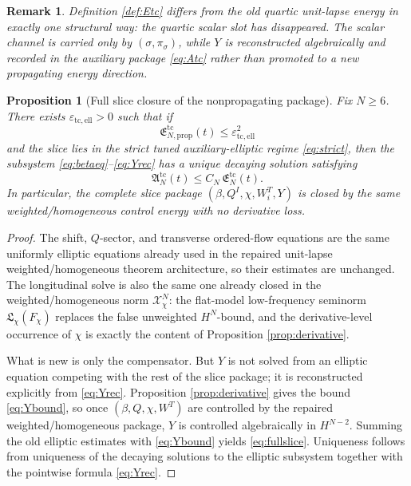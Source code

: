 \documentclass[11pt]{article}
\newtheorem{proposition}{Proposition}
\newtheorem{remark}{Remark}
\begin{document}
\begin{remark}
Definition \ref{def:Etc} differs from the old quartic unit-lapse energy in exactly one structural way: the quartic scalar slot has disappeared. The scalar channel is carried only by \((\sigma,\pi_\sigma)\), while \(Y\) is reconstructed algebraically and recorded in the auxiliary package \eqref{eq:Atc} rather than promoted to a new propagating energy direction.
\end{remark}

\begin{proposition}[Full slice closure of the nonpropagating package]
\label{prop:fullell}
Fix \(N\ge 6\). There exists \(\varepsilon_{\mathrm{tc,ell}}>0\) such that if
\begin{equation}
\mathfrak E_{N,\mathrm{prop}}^{\mathrm{tc}}(t)
\le
\varepsilon_{\mathrm{tc,ell}}^2
\label{eq:ellsmall}
\end{equation}
and the slice lies in the strict tuned auxiliary-elliptic regime \eqref{eq:strict}, then the subsystem \eqref{eq:betaeq}--\eqref{eq:Yrec} has a unique decaying solution satisfying
\begin{equation}
\mathfrak A_N^{\mathrm{tc}}(t)
\le
C_N\,\mathfrak E_N^{\mathrm{tc}}(t).
\label{eq:fullslice}
\end{equation}
In particular, the complete slice package \((\beta,Q^I,\chi,W_i^T,Y)\) is closed by the same weighted/homogeneous control energy with no derivative loss.
\end{proposition}

\begin{proof}
The shift, \(Q\)-sector, and transverse ordered-flow equations are the same uniformly elliptic equations already used in the repaired unit-lapse weighted/homogeneous theorem architecture, so their estimates are unchanged. The longitudinal solve is also the same one already closed in the weighted/homogeneous norm \(\mathcal X_\chi^N\): the flat-model low-frequency seminorm \(\mathfrak L_\chi(F_\chi)\) replaces the false unweighted \(H^N\)-bound, and the derivative-level occurrence of \(\chi\) is exactly the content of Proposition \ref{prop:derivative}.

What is new is only the compensator. But \(Y\) is not solved from an elliptic equation competing with the rest of the slice package; it is reconstructed explicitly from \eqref{eq:Yrec}. Proposition \ref{prop:derivative} gives the bound \eqref{eq:Ybound}, so once \((\beta,Q,\chi,W^T)\) are controlled by the repaired weighted/homogeneous package, \(Y\) is controlled algebraically in \(H^{N-2}\). Summing the old elliptic estimates with \eqref{eq:Ybound} yields \eqref{eq:fullslice}. Uniqueness follows from uniqueness of the decaying solutions to the elliptic subsystem together with the pointwise formula \eqref{eq:Yrec}.
\end{proof}
\end{document}
